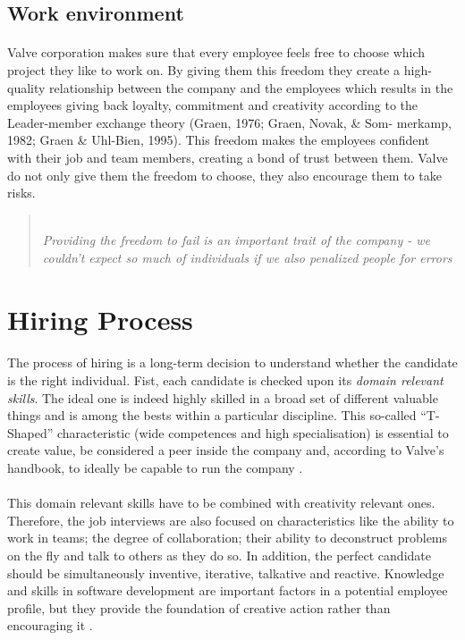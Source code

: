 \documentclass[12pt,twoside,notitle,a4paper]{article}
\begin{document}
\subsection{Work environment}
\paragraph{}Valve corporation makes sure  that every employee feels free to choose which project they like to work on. By giving them this freedom they create a high-quality relationship between the company and the employees which results in the employees giving back loyalty, commitment and creativity according to the Leader-member exchange theory (Graen, 1976; Graen, Novak, \& Som- merkamp, 1982; Graen \& Uhl-Bien, 1995).  
This freedom makes the employees confident with their job and team members, creating a bond of trust between them. Valve do not only give them the freedom to choose, they also encourage them to take risks. 

\blockquote{ \textit{\\Providing the freedom to fail is an important trait of the company - we couldn’t expect so much of individuals if we also penalized people for errors\\}}


\section{Hiring Process}
\paragraph{}The process of hiring is a long-term decision to understand whether the candidate is the right individual. Fist, each candidate is checked upon its \emph{domain relevant skills}. The ideal one is indeed highly skilled in a broad set of different valuable things and is among the bests within a particular discipline. This so-called “T-Shaped” characteristic \cite{handbook} (wide competences and high specialisation) is essential to create value, be considered a peer inside the company and, according to Valve’s handbook, to ideally be capable to run the company \cite{handbook}.

\paragraph{}This domain relevant skills have to be combined with creativity relevant ones. Therefore, the job interviews are also focused on characteristics like the ability to work in teams; the degree of collaboration; their ability to deconstruct problems on the fly and talk to others as they do so. In addition, the perfect candidate should be simultaneously inventive, iterative, talkative and reactive. Knowledge and skills in software development are important factors in a potential employee profile, but they provide the foundation of creative action rather than encouraging it \citep*{unsworth2010employees}.
\end{document}

